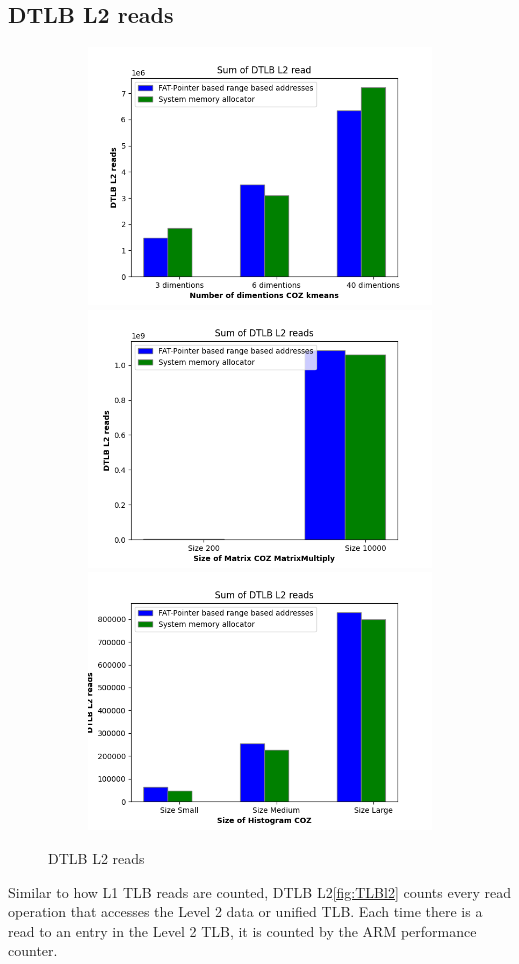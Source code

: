 \subsection{DTLB L2 reads}
\begin{figure}
  \begin{subfigure}{\linewidth}
    \includegraphics[width=.5\linewidth]{l2-tlb-kmeans.png}\hfill
    \includegraphics[width=.5\linewidth]{l2-tlb-matrixmultiply.png}\hfill
    \includegraphics[width=.5\linewidth]{l2-tlb-histogram.png}
\end{subfigure}
\caption{DTLB L2 reads}
\label{TLBl2}
\end{figure}
Similar to how L1 TLB reads are counted, DTLB L2\ref{fig:TLBl2} counts every read operation that accesses the 
Level 2 data or unified TLB. Each time there is a read to an entry in the Level 2 TLB, 
it is counted by the ARM performance counter. 


